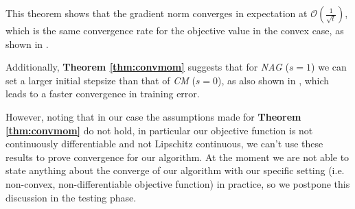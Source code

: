 This theorem shows that the gradient norm converges in expectation at $\mathcal{O}(\frac{1}{\sqrt{t}})$, which is the same convergence rate for the objective value in the convex case, as shown in \cite{sgdunified}.

Additionally, \textbf{Theorem \ref{thm:convmom}} suggests that for \textit{NAG} ($s=1$) we can set a larger initial stepsize than that of \textit{CM} ($s=0$), as also shown in \parencite[Section 4]{sgdunified}, which leads to a faster convergence in training error.

However, noting that in our case the assumptions made for \textbf{Theorem \ref{thm:convmom}} do not hold, in particular our objective function is not continuously differentiable and not Lipschitz continuous, we can't use these results to prove convergence for our algorithm. At the moment we are not able to state anything about the converge of our algorithm with our specific setting (i.e. non-convex, non-differentiable objective function) in practice, so we postpone this discussion in the testing phase.